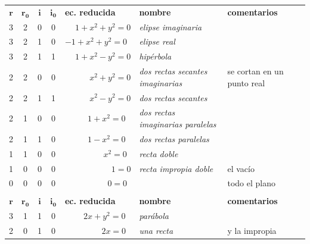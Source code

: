 \documentclass[12pt]{report}
\theoremstyle{definition}
\theoremstyle{definition}
\theoremstyle{remark}
\begin{document}
\begin{center}
\begin{tabular}{|c|c|c|c|m{2.8cm}|m{4.8cm}|m{3.5cm}|}
     \hline
     \rowcolor{Purple1} \multicolumn{7}{|c|}{\textcolor{white}{\textbf{con centro}}} \\
     \hline
     $\mathbf{r}$ & $\mathbf{r_0}$ & $\mathbf{i}$ & $\mathbf{i_0}$ & \centering \textbf{ec. reducida} & \centering \textbf{nombre} & \centering \textbf{comentarios} \tabularnewline
     \hline
     3 & 2 & 0 & 0 & $\phantom{-}1+x^2+y^2=0$ & \textit{elipse imaginaria} & \scriptsize \\
     \hline
     3 & 2 & 1 & 0 & $-1+x^2+y^2=0$ & \textit{elipse real} & \scriptsize \\
     \hline
     3 & 2 & 1 & 1 & $\phantom{-}1+x^2-y^2=0$ & \textit{hipérbola} & \scriptsize \\
     \hline
     2 & 2 & 0 & 0 & $\; \, \phantom{-1+}x^2+y^2=0$ & \textit{dos rectas secantes imaginarias} & \scriptsize se cortan en un punto real \\
     \hline
     2 & 2 & 1 & 1 & $\; \, \phantom{-1+}x^2-y^2=0$ & \textit{dos rectas secantes} & \scriptsize \\
     \hline
     2 & 1 & 0 & 0 & $\qquad \ \ \; 1+x^2=0$ & \textit{dos rectas imaginarias paralelas} & \scriptsize \\
     \hline
     2 & 1 & 1 & 0 & $\qquad \ \ \; 1-x^2=0$ & \textit{dos rectas paralelas} & \scriptsize \\
     \hline
     1 & 1 & 0 & 0 & $\qquad \ \ \ \ \phantom{1-}x^2=0$ & \textit{recta doble} & \scriptsize \\
     \hline
     1 & 0 & 0 & 0 & $\qquad \quad \; \; \; \phantom{1-}1=0$ & \textit{recta impropia doble} & \scriptsize el vacío \\
     \hline
     0 & 0 & 0 & 0 & $\qquad \quad \: \: \, \, \, \, \quad 0=0$ & \textit{} & \scriptsize todo el plano \\
     \hline
     \rowcolor{Green4} \multicolumn{7}{|c|}{\textcolor{white}{\textbf{paraboloides}}} \\
     \hline
     $\mathbf{r}$ & $\mathbf{r_0}$ & $\mathbf{i}$ & $\mathbf{i_0}$ & \centering \textbf{ec. reducida} & \centering \textbf{nombre} & \centering \textbf{comentarios} \tabularnewline
     \hline
     3 & 1 & 1 & 0 & $\qquad \ 2x+y^2=0$ & \textit{parábola} & \scriptsize \\
     \hline
     2 & 0 & 1 & 0 & $\qquad \qquad \, \ 2x=0$ & \textit{una recta} & \scriptsize y la impropia \\
     \hline
\end{tabular}


\end{center}
\end{document}
